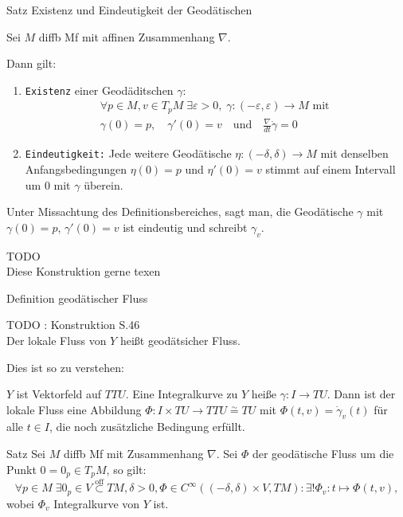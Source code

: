 \documentclass[a6paper,11pt,grid=front]{kartei}
\newcommand{\fl}[1]{\begin{flushleft}
 #1 \end{flushleft}}
\renewcommand{\epsilon}{\varepsilon}
\begin{document}
\nonameyet
{Satz} {\tiny Existenz und Eindeutigkeit der Geodätischen}
{
\small
Sei $M$ diffb Mf mit affinen Zusammenhang $\nabla$. 
\fl{Dann gilt:}
\begin{enumerate}[1.]
\item \texttt{Existenz} einer Geodäditschen $\gamma$: 
\vspace{-0.7em}
\[
\begin{aligned}
\forall p\in M, v\in T_pM \; \exists \epsilon > 0, \;
\gamma:(-\epsilon,\epsilon) \to M \text{ mit } 
\\ 
\gamma(0) = p, 
\quad 
\gamma'(0) = v 
\quad \text{und} \quad 
\frac{\nabla}{dt} \dot \gamma = 0
\end{aligned}
\]
%
\item \texttt{Eindeutigkeit:} Jede weitere Geodätische 
$\eta: (-\delta,\delta) \to M$ mit denselben Anfangsbedingungen
$\eta(0) = p$ und $\eta'(0) = v$ stimmt auf einem Intervall um $0$
mit $\gamma$ überein.
\end{enumerate}
%
\scriptsize
Unter Missachtung des Definitionsbereiches, sagt man, die Geodätische 
$\gamma$ mit $\gamma(0) = p$, $\gamma'(0) = v$ ist eindeutig und schreibt
$\gamma_v$.
\\
}
{
	TODO 
	\\
	Diese Konstruktion gerne texen
}

\nonameyet
{Definition} {geodätischer Fluss}
{
TODO : Konstruktion S.46 
%
\\
Der lokale Fluss von $Y$ heißt geodätsicher Fluss.
\scriptsize 
\fl{Dies ist so zu verstehen:}
$Y$ ist Vektorfeld auf $TTU$. Eine Integralkurve zu $Y$ heiße
$\gamma : I \to TU$. Dann ist der lokale Fluss eine Abbildung
$\Phi: I \times TU \to TTU \overset{\sim}{=} TU$ mit 
$ \Phi(t,v) = \dot\gamma_v(t)$ für alle $t\in I$, die noch zusätzliche 
Bedingung erfüllt.
}
{}

\nonameyet
{Satz} {}
{
Sei $M$ diffb Mf mit Zusammenhang $\nabla$. Sei $\Phi$ der geodätische
Fluss um die Punkt $0 = 0_p \in T_p M$, so gilt:
\scriptsize
\[
\forall p\in M \; \exists 0_p \in V \overset{\text{off}}{\subset} TM,
\delta > 0, \Phi\in C^\infty((-\delta,\delta)\times V,TM)
: \exists! \Phi_v : t\mapsto \Phi(t,v), 
\]
wobei $\Phi_v$ Integralkurve von $Y$ ist.
}
{}
\end{document}
